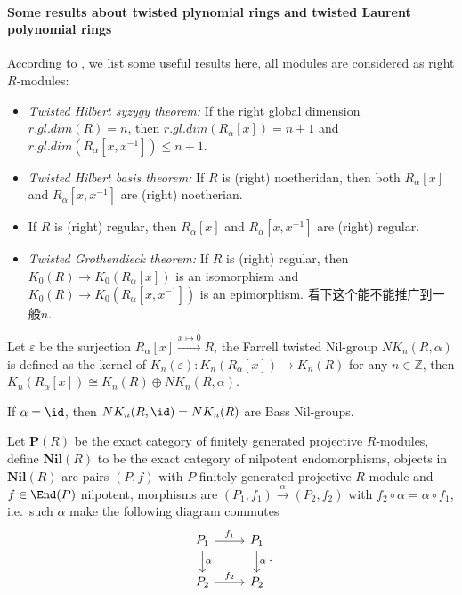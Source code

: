 \paragraph{Some results about twisted plynomial rings and twisted Laurent polynomial rings}
According to \cite{MR41:5457}, we list some useful results here, all modules are considered as right $R$-modules:
\begin{itemize}
	\item \emph{Twisted Hilbert syzygy theorem:} If the right global dimension $r.gl.dim(R)=n$, then $r.gl.dim(R_{\alpha}[x])=n+1$ and $r.gl.dim(R_{\alpha}[x,x^{-1}])\leq n+1$.
	\item \emph{Twisted Hilbert basis theorem:} If $R$ is (right) noetheridan, then both $R_{\alpha}[x]$ and $R_{\alpha}[x,x^{-1}]$ are (right) noetherian.
	\item If $R$ is (right) regular, then $R_{\alpha}[x]$ and $R_{\alpha}[x,x^{-1}]$ are (right) regular.
	\item \emph{Twisted Grothendieck theorem:} If $R$ is (right) regular, then $K_0(R)\longrightarrow K_0(R_{\alpha}[x])$ is an isomorphism and $K_0(R)\longrightarrow K_0(R_{\alpha}[x,x^{-1}]) $ is an epimorphism. {\color{red}看下这个能不能推广到一般$n$.}
\end{itemize}



\begin{definition}
	Let $\varepsilon$ be the surjection $R_{\alpha}[x] \overset{x \mapsto 0}\longrightarrow R$, the Farrell twisted Nil-group $NK_n(R,\alpha)$ is defined as the kernel of $K_n(\varepsilon) \colon K_n(R_\alpha[x])\longrightarrow K_n(R)$ for any $n\in \mathbb{Z}$, then $K_n(R_\alpha[x])\cong K_n(R)\oplus NK_n(R,\alpha)$.
\end{definition}
\begin{remark}
	If $\alpha=\id$, then $NK_n(R,\id) = NK_n(R)$ are Bass Nil-groups. 
\end{remark}

Let $\mathbf{P}(R)$ be the exact category of finitely generated projective $R$-modules, define $\mathbf{Nil}(R)$ to be the exact category of nilpotent endomorphisms, objects in $\mathbf{Nil}(R)$ are pairs $(P,f)$ with $P$ finitely generated projective $R$-module and $f\in \End(P)$ nilpotent, morphisms are $(P_1,f_1) \overset{\alpha}\longrightarrow (P_2,f_2)$ with $f
_2\circ \alpha =\alpha \circ f_1$, i.e.\ such $\alpha$ make the following diagram commutes
\[
\begin{tikzcd}
	P_1 \arrow[r,"f_1"] \arrow[d,"\alpha"] & P_1 \arrow[d,"\alpha"]\\
	P_2 \arrow[r,"f_2"]  & P_2
\end{tikzcd}.
\]

